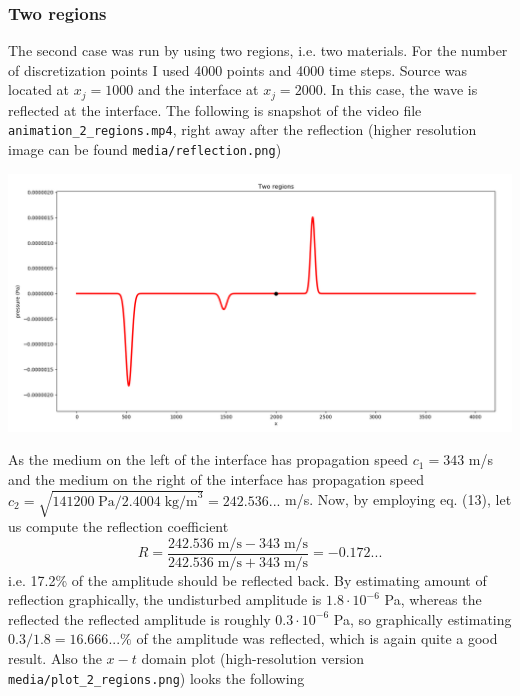 \documentclass[]{article}
\begin{document}
\subsubsection{Two regions}
The second case was run by using two regions, i.e. two materials. For the number of discretization points I used 4000 points and 4000 time steps. Source was located at $x_j=1000$ and the interface at $x_j=2000$. In this case, the wave is reflected at the interface. The following is snapshot of the video file \texttt{animation\_2\_regions.mp4}, right away after the reflection (higher resolution image can be found \texttt{media/reflection.png})
\begin{center}
	\includegraphics[width=1.0\linewidth]{media/reflected}
\end{center}
As the medium on the left of the interface has propagation speed $c_1=343$ m/s and the medium on the right of the interface has propagation speed $c_2=\sqrt{141200\;\textrm{Pa}/2.4004\;\textrm{kg/m}^3}=242.536...$ m/s. Now, by employing eq. (13), let us compute the reflection coefficient
\begin{equation}
	R=\frac{242.536\;\textrm{m/s}-343\;\textrm{m/s}}{242.536\;\textrm{m/s}+343\;\textrm{m/s}}=-0.172...
\end{equation}
i.e. 17.2\% of the amplitude should be reflected back. By estimating amount of reflection graphically, the undisturbed amplitude is $1.8\cdot 10^{-6}$ Pa, whereas the reflected the reflected amplitude is roughly $0.3\cdot 10^{-6}$ Pa, so graphically estimating $0.3/1.8=16.666...\%$ of the amplitude was reflected, which is again quite a good result. Also the $x-t$ domain plot (high-resolution version \texttt{media/plot\_2\_regions.png}) looks the following \\
\end{document}
